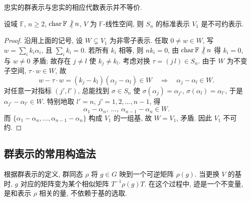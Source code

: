 \begin{remark}\label{rem:faithful-not-equiv}
忠实的群表示与忠实的相应代数表示并不等价.
\end{remark}

\begin{proposition}\label{prop:std-irreducible}
设域 $\mathbb{F}$, $n\ge2$, $\operatorname{char}\mathbb{F}\mathrel{\not\big|} n$, $V$ 为 $\mathbb{F}$-线性空间, 则 $S_n$ 的标准表示 $V_1$ 是不可约表示.
\end{proposition}

\begin{proof}
沿用上面的记号, 设 $W\subsetneq V_1$ 为非零子表示.
任取 $0\neq w\in W$, 写 $w=\sum_i k_i\alpha_i$, 且 $\sum_i k_i=0$.
若所有 $k_i$ 相等, 则 $nk_i=0$, 由 $\operatorname{char}\mathbb{F}\mathrel{\not\big|} n$ 得 $k_i=0$, 与 $w\neq0$ 矛盾;
故存在 $j\neq l$ 使 $k_j\neq k_l$.
考虑对换 $\tau=(j\,l)\in S_n$. 由于 $W$ 为不变子空间, $\tau\cdot w\in W$, 故
\begin{equation*}
  w-\tau\cdot w=(k_j-k_l)(\alpha_j-\alpha_l)\in W
  \quad\Longrightarrow\quad \alpha_j-\alpha_l\in W .
\end{equation*}
对任意一对指标 $(j',l')$, 总能找到 $\sigma\in S_n$ 使 $\sigma(\alpha_j)=\alpha_{j'}$, $\sigma(\alpha_l)=\alpha_{l'}$, 于是
$\alpha_{j'}-\alpha_{l'}\in W$. 特别地取 $l'=n$, $j'=1,2,\dots,n-1$, 得
\begin{equation*}
  \alpha_1-\alpha_n,\ \dots,\ \alpha_{n-1}-\alpha_n\in W .
\end{equation*}
而 $\{\alpha_1-\alpha_n,\dots,\alpha_{n-1}-\alpha_n\}$ 构成 $V_1$ 的一组基, 故 $W=V_1$, 矛盾.
因此 $V_1$ 不可约.
\end{proof}

\subsection{群表示的常用构造法}

根据群表示的定义, 群同态 $\rho$ 将 $g\in G$ 映到一个可逆矩阵 $\rho(g)$.
当更换 $V$ 的基时, $g$ 对应的矩阵变为某个相似矩阵 $T^{-1}\rho(g)T$.
在这个过程中, 迹是一个不变量, 是和表示 $\rho$ 相关的量, 不依赖于基的选取.


